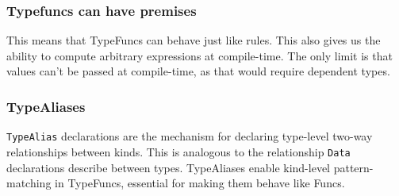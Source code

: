 \subsubsection*{Typefuncs can have premises}
This means that TypeFuncs can behave just like rules.
This also gives us the ability to compute arbitrary expressions at compile-time.
The only limit is that values can't be passed at compile-time, as that would require dependent types.

\subsubsection*{TypeAliases}
\texttt{TypeAlias} declarations are the mechanism for declaring type-level two-way relationships between kinds.
This is analogous to the relationship \texttt{Data} declarations describe between types.
TypeAliases enable kind-level pattern-matching in TypeFuncs, essential for making them behave like Funcs.
